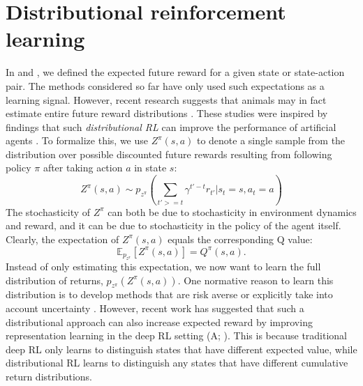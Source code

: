 \section{Distributional reinforcement learning}
\label{sec:distributional}

In  and , we defined the expected future reward for a given state or state-action pair.
The methods considered so far have only used such expectations as a learning signal.
However, recent research suggests that animals may in fact estimate entire future reward distributions \citep{dabney2020distributional, sousa2023dopamine}.
These studies were inspired by findings that such \emph{distributional RL} can improve the performance of artificial agents \citep{bellemare2017distributional, bellemare2023distributional,dabney2018distributional}.
To formalize this, we use $Z^\pi(s, a)$ to denote a single sample from the distribution over possible discounted future rewards resulting from following policy $\pi$ after taking action $a$ in state $s$:
\begin{equation}
    Z^\pi(s, a) \sim p_{z^\pi} \left ( \sum_{t' >= t} \gamma^{t' - t} r_{t'} | s_t = s, a_t = a \right )
\end{equation}
The stochasticity of $Z^\pi$ can both be due to stochasticity in environment dynamics and reward, and it can be due to stochasticity in the policy of the agent itself.
Clearly, the expectation of $Z^\pi(s, a)$ equals the corresponding Q value:
\begin{equation}
    \mathbb{E}_{p_{z^\pi}} \left [ Z^\pi(s, a) \right ] = Q^\pi(s, a).
\end{equation}
Instead of only estimating this expectation, we now want to learn the full distribution of returns, $p_{z^\pi}(Z^\pi(s, a))$.
One normative reason to learn this distribution is to develop methods that are risk averse \citep{morimura2010nonparametric,morimura2012parametric} or explicitly take into account uncertainty \citep{dearden1998bayesian}.
However, recent work has suggested that such a distributional approach can also increase expected reward by improving representation learning in the deep RL setting (A; \citealp{bellemare2017distributional,dabney2018distributional,rowland2019statistics,bellemare2023distributional}).
This is because traditional deep RL only learns to distinguish states that have different expected value, while distributional RL learns to distinguish any states that have different cumulative return distributions.

